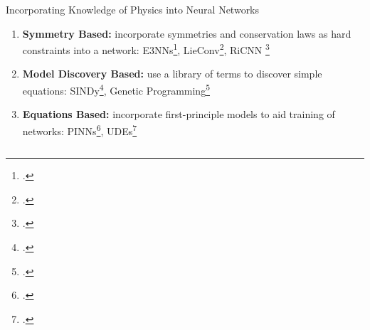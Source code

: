 \documentclass[8pt]{beamer}
\begin{document}
\begin{frame}{Incorporating Knowledge of Physics into Neural Networks}
\begin{enumerate}
	\item<2-> \textbf{Symmetry Based:} incorporate symmetries and conservation laws as hard constraints into a network: E3NNs\footcite{geiger2022e3nn}, LieConv\footcite{Finzi2020}, RiCNN \footcite{chidester2018rotation}
	\item<3-> \textbf{Model Discovery Based:} use a library of terms to discover simple equations: SINDy\footcite{champion2019data}, Genetic Programming\footcite{schmidt2009distilling}
	\item<4-> \textbf{Equations Based:} incorporate first-principle models to aid training of networks: PINNs\footcite{raissi2017physics}, UDEs\footcite{rackauckas2020udes}
\end{enumerate}

\begin{columns}[T,onlytextwidth]
\end{columns}

\end{frame}
\end{document}
